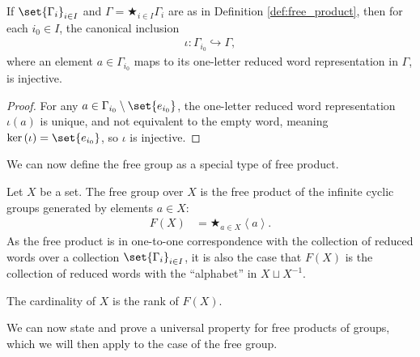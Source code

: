 \begin{corollary}
  If $\set{\Gamma_i}_{i\in I}$ and $\Gamma = \bigstar_{i\in I}\Gamma_i$ are as in Definition \ref{def:free_product}, then for each $i_0\in I$, the canonical inclusion
  \begin{align*}
    \iota\colon \Gamma_{i_0}\hookrightarrow \Gamma,
  \end{align*}
  where an element $a\in \Gamma_{i_0}$ maps to its one-letter reduced word representation in $\Gamma$, is injective.
\end{corollary}
\begin{proof}
  For any $a\in \Gamma_{i_0}\setminus \set{e_{i_0}}$, the one-letter reduced word representation $\iota(a)$ is unique, and not equivalent to the empty word, meaning $\ker\left(\iota\right) = \set{e_{i_0}}$, so $\iota$ is injective.
\end{proof}
We can now define the free group as a special type of free product.
\begin{definition}
  Let $X$ be a set. The {free group} over $X$ is the free product of the infinite cyclic groups generated by elements $a\in X$:
  \begin{align*}
    F(X) &= \bigstar_{a\in X}\left\langle a \right\rangle.
  \end{align*}
  As the free product is in one-to-one correspondence with the collection of reduced words over a collection $\set{\Gamma_i}_{i\in I}$, it is also the case that $F(X)$ is the collection of reduced words with the ``alphabet'' in $X\sqcup X^{-1}$.\newline

  The cardinality of $X$ is the rank of $F(X)$.\label{def:free_group_as_product}
\end{definition}
We can now state and prove a universal property for free products of groups, which we will then apply to the case of the free group.
